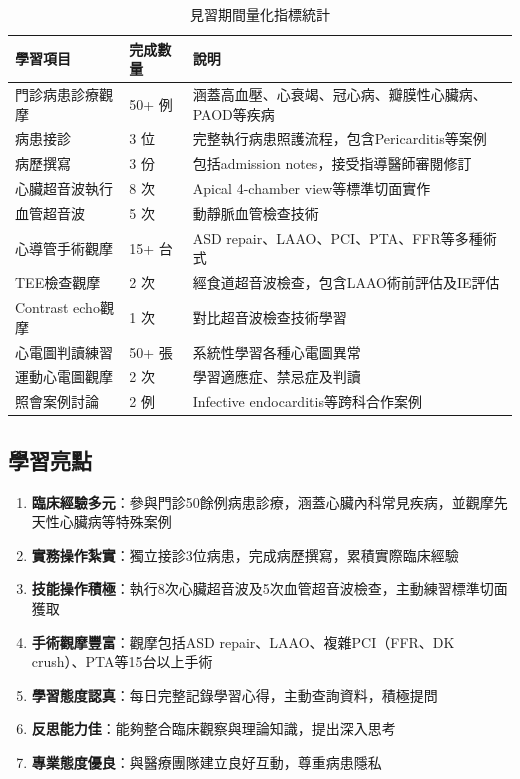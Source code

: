 \documentclass[12pt,a4paper]{article}
\begin{document}
\begin{table}[h]
\centering
\caption{見習期間量化指標統計}
\begin{tabular}{|p{4cm}|p{2cm}|p{6cm}|}
\hline
\textbf{學習項目} & \textbf{完成數量} & \textbf{說明} \\
\hline
門診病患診療觀摩 & 50+ 例 & 涵蓋高血壓、心衰竭、冠心病、瓣膜性心臟病、PAOD等疾病 \\
\hline
病患接診 & 3 位 & 完整執行病患照護流程，包含Pericarditis等案例 \\
\hline
病歷撰寫 & 3 份 & 包括admission notes，接受指導醫師審閱修訂 \\
\hline
心臟超音波執行 & 8 次 & Apical 4-chamber view等標準切面實作 \\
\hline
血管超音波 & 5 次 & 動靜脈血管檢查技術 \\
\hline
心導管手術觀摩 & 15+ 台 & ASD repair、LAAO、PCI、PTA、FFR等多種術式 \\
\hline
TEE檢查觀摩 & 2 次 & 經食道超音波檢查，包含LAAO術前評估及IE評估 \\
\hline
Contrast echo觀摩 & 1 次 & 對比超音波檢查技術學習 \\
\hline
心電圖判讀練習 & 50+ 張 & 系統性學習各種心電圖異常 \\
\hline
運動心電圖觀摩 & 2 次 & 學習適應症、禁忌症及判讀 \\
\hline
照會案例討論 & 2 例 & Infective endocarditis等跨科合作案例 \\
\hline
\end{tabular}
\end{table}

\subsection{學習亮點}

\begin{enumerate}
\item \textbf{臨床經驗多元}：參與門診50餘例病患診療，涵蓋心臟內科常見疾病，並觀摩先天性心臟病等特殊案例
\item \textbf{實務操作紮實}：獨立接診3位病患，完成病歷撰寫，累積實際臨床經驗
\item \textbf{技能操作積極}：執行8次心臟超音波及5次血管超音波檢查，主動練習標準切面獲取
\item \textbf{手術觀摩豐富}：觀摩包括ASD repair、LAAO、複雜PCI（FFR、DK crush）、PTA等15台以上手術
\item \textbf{學習態度認真}：每日完整記錄學習心得，主動查詢資料，積極提問
\item \textbf{反思能力佳}：能夠整合臨床觀察與理論知識，提出深入思考
\item \textbf{專業態度優良}：與醫療團隊建立良好互動，尊重病患隱私
\end{enumerate}
\end{document}
